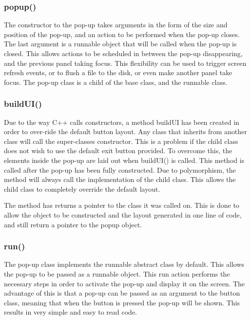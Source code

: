 \subsubsection{popup()}

The constructor to the pop-up takes arguments in the form of the size and position of the pop-up, and an action to be performed when the pop-up closes. The last argument is a runnable object that will be called when the pop-up is closed. This allows actions to be scheduled in between the pop-up disappearing, and the previous panel taking focus. This flexibility can be used to trigger screen refresh events, or to flush a file to the disk, or even make another panel take focus. The pop-up class is a child of the base class, and the runnable class.

\subsubsection{buildUI()}

Due to the way C++ calls constructors, a method buildUI has been created in order to over-ride the default button layout. Any class that inherits from another class will call the super-classes constructor. This is a problem if the child class does not wish to use the default exit button provided. To overcome this, the elements inside the pop-up are laid out when buildUI() is called. This method is called after the pop-up has been fully constructed. Due to polymorphism, the method will always call the implementation of the child class. This allows the child class to completely override the default layout.

The method has returns a pointer to the class it was called on. This is done to allow the object to be constructed and the layout generated in one line of code, and still return a pointer to the popup object.

\subsubsection{run()}

The pop-up class implements the runnable abstract class by default. This allows the pop-up to be passed as a runnable object. This run action performs the necessary steps in order to activate the pop-up and display it on the screen. The advantage of this is that a pop-up can be passed as an argument to the button class, meaning that when the button is pressed the pop-up will be shown. This results in very simple and easy to read code.

